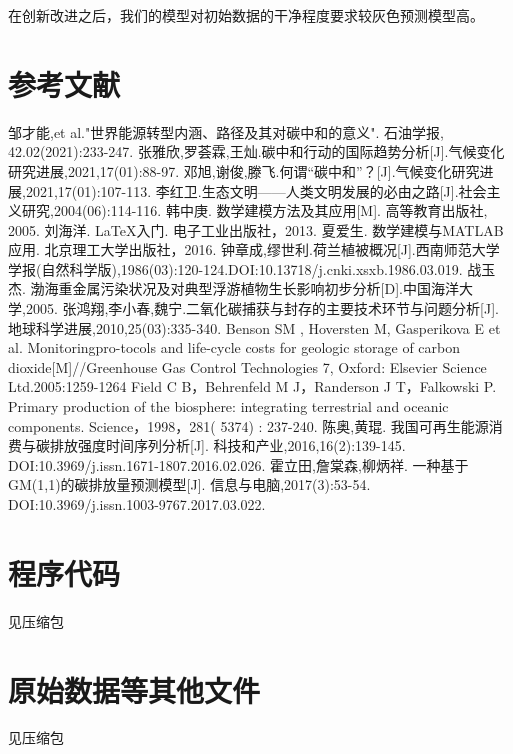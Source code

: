 \documentclass[bwprint]{gmcmthesis}
\numberwithin{figure}{section}
\begin{document}
	在创新改进之后，我们的模型对初始数据的干净程度要求较灰色预测模型高。


\newpage
\section{参考文献}
\begin{thebibliography}{1.2}%
	\setlength{\itemsep}{-2mm}
	邹才能,et al."世界能源转型内涵、路径及其对碳中和的意义". 石油学报, 42.02(2021):233-247. 
	张雅欣,罗荟霖,王灿.碳中和行动的国际趋势分析[J].气候变化研究进展,2021,17(01):88-97.
	邓旭,谢俊,滕飞.何谓“碳中和”？[J].气候变化研究进展,2021,17(01):107-113.
	李红卫.生态文明——人类文明发展的必由之路[J].社会主义研究,2004(06):114-116.
	韩中庚. 数学建模方法及其应用[M]. 高等教育出版社, 2005.
	刘海洋. LaTeX入门. 电子工业出版社，2013.
	夏爱生. 数学建模与MATLAB应用. 北京理工大学出版社，2016.
	钟章成,缪世利.荷兰植被概况[J].西南师范大学学报(自然科学版),1986(03):120-124.DOI:10.13718/j.cnki.xsxb.1986.03.019.
	战玉杰. 渤海重金属污染状况及对典型浮游植物生长影响初步分析[D].中国海洋大学,2005.
	张鸿翔,李小春,魏宁.二氧化碳捕获与封存的主要技术环节与问题分析[J].地球科学进展,2010,25(03):335-340.
	Benson SM , Hoversten M, Gasperikova E et al. Monitoringpro-tocols and life-cycle costs for geologic storage of carbon dioxide[M]//Greenhouse Gas Control Technologies 7, Oxford: Elsevier Science Ltd.2005:1259-1264
	Field C B，Behrenfeld M J，Randerson J T，Falkowski P. Primary production of the biosphere: integrating terrestrial and oceanic components. Science，1998，281( 5374) : 237-240.
	陈奥,黄琨. 我国可再生能源消费与碳排放强度时间序列分析[J]. 科技和产业,2016,16(2):139-145. DOI:10.3969/j.issn.1671-1807.2016.02.026.
	霍立田,詹棠森,柳炳祥. 一种基于GM(1,1)的碳排放量预测模型[J]. 信息与电脑,2017(3):53-54. DOI:10.3969/j.issn.1003-9767.2017.03.022.
\end{thebibliography}

\newpage
\appendix
\section{程序代码}
见压缩包
 \section{原始数据等其他文件}
 见压缩包
\end{document}
